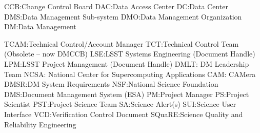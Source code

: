 CCB:Change Control Board
DAC:Data Access Center
DC:Data Center
DMS:Data Management Sub-system
DMO:Data Management Organization
DM:Data Management

TCAM:Technical Control/Account Manager
TCT:Technical Control Team (Obsolete -- now DMCCB)
LSE:LSST Systems Engineering (Document Handle)
LPM:LSST Project Management (Document Handle)
DMLT: DM Leadership Team
NCSA: National Center for Supercomputing Applications
CAM: CAMera
DMSR:DM System Requirements
NSF:National Science Foundation
DMS:Document Management System (ESA)
PM:Project Manager
PS:Project Scientist
PST:Project Science Team
SA:Science Alert(s)
SUI:Science User Interface
VCD:Verification Control Document
SQuaRE:Science Quality and Reliability Engineering
